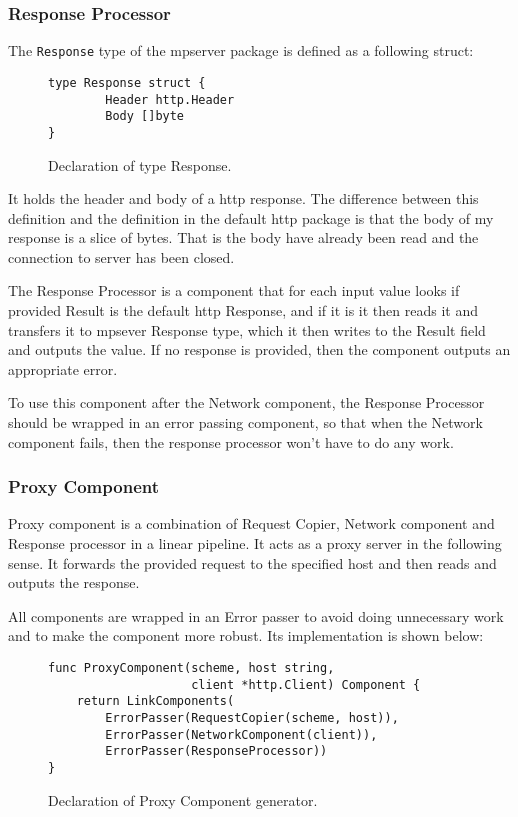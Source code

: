 \documentclass[12pt,a4paper]{article}
\begin{document}
\subsubsection{Response Processor}
The \texttt{Response} type of the mpserver package is defined as a following struct:

\begin{figure}[h]
\centering
\begin{lstlisting}
type Response struct {
		Header http.Header
		Body []byte
}
\end{lstlisting}
\caption[scale=1.0]{Declaration of type Response.}
\label{fig:Response}
\end{figure}

It holds the header and body of a http response. The difference between
this definition and the definition in the default http package is that
the body of my response is a slice of bytes. That is the body have already been
read and the connection to server has been closed.

The Response Processor is a component that for each input value
looks if provided Result is the default http Response, and if it is
it then reads it and transfers it to mpsever Response type, which it
then writes to the Result field and outputs the value. If no response
is provided, then the component outputs an appropriate error.

To use this component after the Network component, the Response Processor
should be wrapped in an error passing component, so that when the 
Network component fails, then the response processor won't have to do
any work.

\subsubsection{Proxy Component}
Proxy component is a combination of Request Copier, Network component 
and Response processor in a linear pipeline. It acts as a proxy server
in the following sense. It forwards the provided request to the specified
host and then reads and outputs the response. 

All components are wrapped
in an Error passer to avoid doing unnecessary work and to make the component
more robust. Its implementation is shown below:

\begin{figure}[h]
\centering
\begin{lstlisting}
func ProxyComponent(scheme, host string, 
					client *http.Client) Component {
	return LinkComponents(
		ErrorPasser(RequestCopier(scheme, host)),
		ErrorPasser(NetworkComponent(client)),
		ErrorPasser(ResponseProcessor))
}
\end{lstlisting}
\caption[scale=1.0]{Declaration of Proxy Component generator.}
\label{fig:ProxyComp}
\end{figure}
\end{document}
